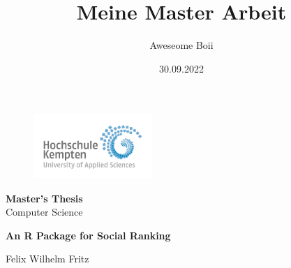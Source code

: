 \documentclass[
  12pt,
  a4paper,
  oneside]{book}
\title{Meine Master Arbeit}
\author{Aweseome Boii}
\date{30.09.2022}
\begin{document}
\frontmatter
\maketitle

\thispagestyle{empty}

\begin{figure}[t]
 \raggedleft
 \includegraphics[width=0.4\textwidth]{imgs/logo.jpg}
\end{figure}






\onehalfspacing
\begin{center}
    \textbf{\large{Master's Thesis}}\\
    \large{Computer Science}\\
    \vspace{50pt}

    \textbf{\LARGE{An R Package for Social Ranking}}\\
    \vspace{50pt}

    \large{Felix Wilhelm Fritz}\\
    \vspace{150pt}
\end{center}
\end{document}

